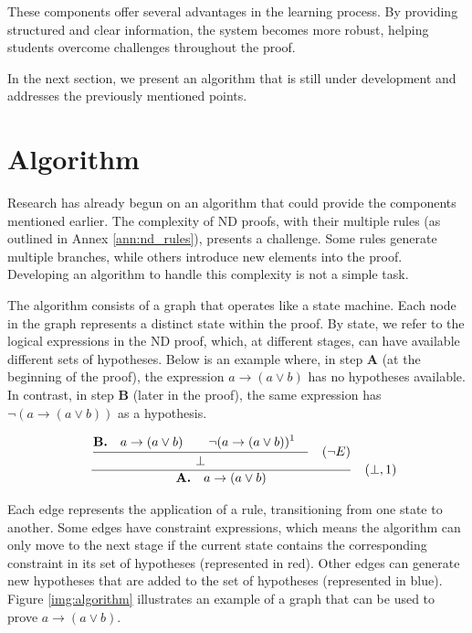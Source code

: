 These components offer several advantages in the learning process. By providing structured and clear information, the system becomes more robust, helping students overcome challenges throughout the proof.

In the next section, we present an algorithm that is still under development and addresses the previously mentioned points.

\section{Algorithm}
Research has already begun on an algorithm that could provide the components mentioned earlier. The complexity of \gls{ND} proofs, with their multiple rules (as outlined in Annex \ref{ann:nd_rules}), presents a challenge. Some rules generate multiple branches, while others introduce new elements into the proof. Developing an algorithm to handle this complexity is not a simple task.

The algorithm consists of a graph that operates like a state machine. Each node in the graph represents a distinct state within the proof. By state, we refer to the logical expressions in the \gls{ND} proof, which, at different stages, can have available different sets of hypotheses. Below is an example where, in step \textbf{A} (at the beginning of the proof), the expression \(a \to (a \lor b)\) has no hypotheses available. In contrast, in step \textbf{B} (later in the proof), the same expression has \(\neg(a \to (a \lor b))\) as a hypothesis.

\[
\begin{array}{c c}
   \quad \frac{\displaystyle \frac{\displaystyle 
    {\displaystyle \textbf{B.} \quad a \to (a \lor b) \strut} \quad \quad \neg(a \to (a \lor b))^1 \quad \strut} {\displaystyle \bot \strut} \quad (\neg E) \strut}
    {\displaystyle \textbf{A.} \quad a \to (a \lor b)\strut} \quad (\bot, 1) 
\end{array}
\]

Each edge represents the application of a rule, transitioning from one state to another. Some edges have constraint expressions, which means the algorithm can only move to the next stage if the current state contains the corresponding constraint in its set of hypotheses (represented in red). Other edges can generate new hypotheses that are added to the set of hypotheses (represented in blue). Figure \ref{img:algorithm} illustrates an example of a graph that can be used to prove \(a \to (a \lor b)\).

